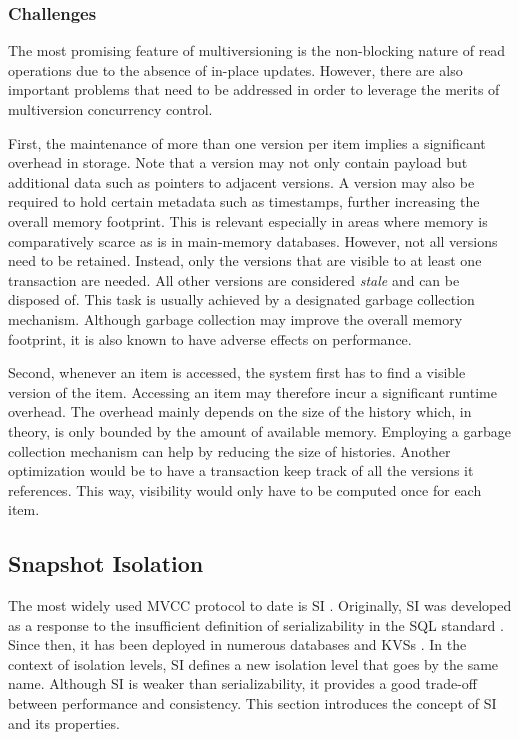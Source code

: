 \subsubsection{Challenges}

The most promising feature of multiversioning is the non-blocking nature of read
operations due to the absence of in-place updates. However, there are also
important problems that need to be addressed in order to leverage the merits of
multiversion concurrency control.

First, the maintenance of more than one version per item implies a significant
overhead in storage. Note that a version may not only contain payload but
additional data such as pointers to adjacent versions. A version may also be
required to hold certain metadata such as timestamps, further increasing the
overall memory footprint. This is relevant especially in areas where memory is
comparatively scarce as is in main-memory databases. However, not all versions
need to be retained. Instead, only the versions that are visible to at least one
transaction are needed. All other versions are considered \emph{stale} and can
be disposed of. This task is usually achieved by a designated garbage collection
mechanism. Although garbage collection may improve the overall memory footprint,
it is also known to have adverse effects on performance.

Second, whenever an item is accessed, the system first has to find a visible
version of the item. Accessing an item may therefore incur a significant runtime
overhead. The overhead mainly depends on the size of the history which, in
theory, is only bounded by the amount of available memory. Employing a garbage
collection mechanism can help by reducing the size of histories. Another
optimization would be to have a transaction keep track of all the versions it
references. This way, visibility would only have to be computed once for each
item.

\subsection{Snapshot Isolation}

The most widely used \ac{MVCC} protocol to date is \ac{SI} \cite{larson2011high,
neumann2015fast}. Originally, \ac{SI} was developed as a response to the
insufficient definition of serializability in the SQL standard
\cite{berenson1995critique}. Since then, it has been deployed in numerous
databases and \acp{KVS} \cite{cahill2009serializable, wu2017empirical}. In the
context of isolation levels, \ac{SI} defines a new isolation level that goes by
the same name. Although \ac{SI} is weaker than serializability, it provides a
good trade-off between performance and consistency. This section introduces the
concept of \ac{SI} and its properties.

